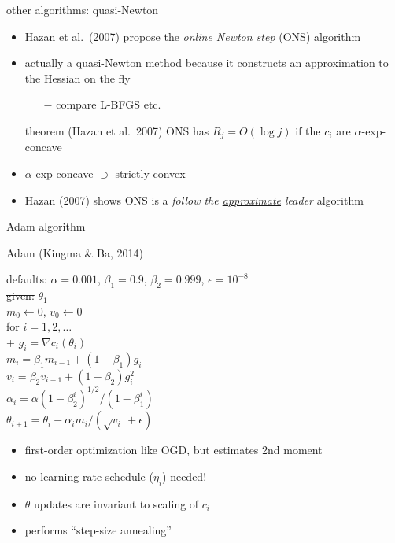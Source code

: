 \documentclass[xcolor={svgnames},
               hyperref={colorlinks,citecolor=DeepPink4,linkcolor=FireBrick,urlcolor=Maroon}]
               {beamer}
\newcommand{\grad}{\nabla}
\newcommand{\eps}{\epsilon}
\begin{document}
\begin{frame}{other algorithms: quasi-Newton}

\begin{itemize}
\item Hazan et al.~(2007) propose the \emph{online Newton step} (ONS) algorithm
\item actually a quasi-Newton method because it constructs an approximation to the Hessian on the fly
    \begin{itemize}
    \item[$-$] compare L-BFGS etc.
    \end{itemize}

\begin{block}{theorem (Hazan et al.~2007)}
ONS has $R_j = O(\log j)$ if the $c_i$ are $\alpha$-exp-concave
\end{block}

\item $\alpha$-exp-concave $\supset$ strictly-convex
\item Hazan (2007) shows ONS is a \emph{follow the \underline{approximate} leader} algorithm
\end{itemize}
\end{frame}


\begin{frame}{Adam algorithm}

\begin{block}{Adam (Kingma \& Ba, 2014)}

\begin{pseudo*}
\st{defaults:} $\alpha=0.001$, $\beta_1=0.9$, $\beta_2=0.999$, $\eps=10^{-8}$ \\
\st{given:} $\theta_1$ \\
$m_0 \gets 0$, $v_0 \gets 0$ \\
for $i=1,2,\dots$ \\+
    $g_i = \grad c_i(\theta_i)$ \\
    $m_i = \beta_1 m_{i-1} + (1-\beta_1) g_i$  \hspace{15mm}  \\
    $v_i = \beta_2 v_{i-1} + (1-\beta_2) g_i^2$  \hspace{17mm}  \\
    $\alpha_i = \alpha (1-\beta_2^i)^{1/2} / (1-\beta_1^i)$  \hspace{13mm}  \\
    $\theta_{i+1} = \theta_i - \alpha_i m_i / (\sqrt{v_i\,} + \eps)$
\end{pseudo*}
\end{block}

\begin{itemize}
\item first-order optimization like OGD, but estimates 2nd moment
\item no learning rate schedule ($\eta_i$) needed!
\item $\theta$ updates are invariant to scaling of $c_i$
\item performs ``step-size annealing''
\end{itemize}
\end{frame}
\end{document}
